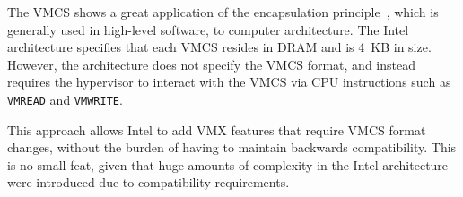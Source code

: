 The VMCS shows a great application of the encapsulation
principle~\cite{liskov1974adt}, which is generally used in high-level software,
to computer architecture. The Intel architecture specifies that each VMCS
resides in DRAM and is 4~KB in size. However, the architecture does not specify
the VMCS format, and instead requires the hypervisor to interact with the VMCS
via CPU instructions such as \texttt{VMREAD} and \texttt{VMWRITE}.

This approach allows Intel to add VMX features that require VMCS format
changes, without the burden of having to maintain backwards compatibility.
This is no small feat, given that huge amounts of complexity in the Intel
architecture were introduced due to compatibility requirements.
